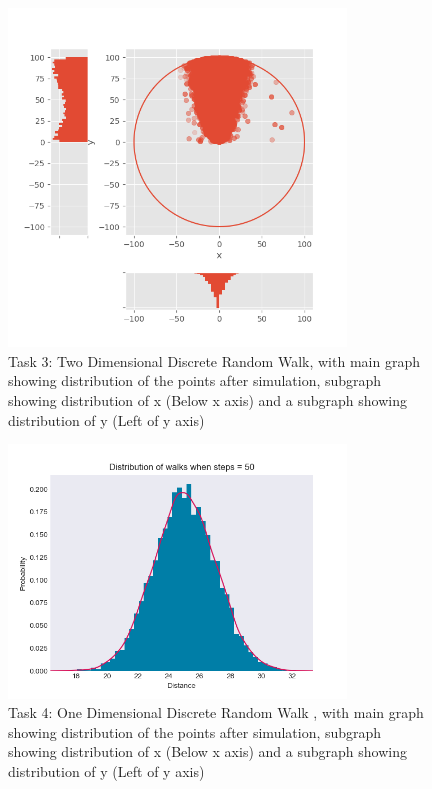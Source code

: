 \documentclass[a4paper, 11pt]{book} %
\begin{document}
\begin{figure}[h]
	\centering
	\includegraphics[width=0.8\textwidth]{Task3.png}
	\caption{Task 3: Two Dimensional Discrete Random Walk, with main graph showing distribution of the points after simulation, subgraph showing distribution of x (Below x axis) and a subgraph showing distribution of y (Left of y axis)}
	\label{fig:reflectionrule}
\end{figure}

\begin{figure}[h]
	\centering
	\includegraphics[width=0.8\textwidth]{task 4.png}
	\caption{Task 4: One Dimensional Discrete Random Walk , with main graph showing distribution of the points after simulation, subgraph showing distribution of x (Below x axis) and a subgraph showing distribution of y (Left of y axis)}
	\label{fig:task4}
\end{figure}
\end{document}
